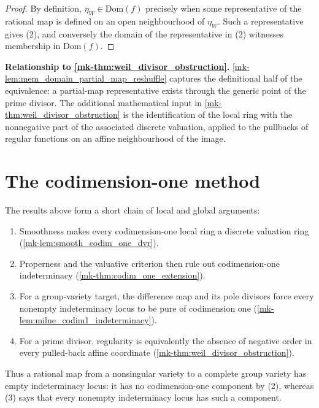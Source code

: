 \begin{proof}

  By definition, \(\eta_W\in\mathrm{Dom}(f)\) precisely when some
  representative of the rational map is defined on an open neighbourhood of
  \(\eta_W\).  Such a representative gives (2), and conversely the domain of
  the representative in (2) witnesses membership in \(\mathrm{Dom}(f)\).
\end{proof}

\begin{remark}
  \label{mk-rmk:mem_domain_partial_map_reshuffle_scope}
  \textbf{Relationship to \ref{mk-thm:weil_divisor_obstruction}.}
  \ref{mk-lem:mem_domain_partial_map_reshuffle} captures the definitional half of
  the equivalence: a partial-map representative exists through the generic point
  of the prime divisor. The additional mathematical input in
  \ref{mk-thm:weil_divisor_obstruction} is the identification of the local ring with
  the nonnegative part of the associated discrete valuation, applied to the
  pullbacks of regular functions on an affine neighbourhood of the image.
\end{remark}

\section{The codimension-one method}
The results above form a short chain of local and global arguments:
\begin{enumerate}
  \item Smoothness makes every codimension-one local ring a discrete
    valuation ring (\ref{mk-lem:smooth_codim_one_dvr}).
  \item Properness and the valuative criterion then rule out
    codimension-one indeterminacy (\ref{mk-thm:codim_one_extension}).
  \item For a group-variety target, the difference map and its pole
    divisors force every nonempty indeterminacy locus to be pure of
    codimension one (\ref{mk-lem:milne_codim1_indeterminacy}).
  \item For a prime divisor, regularity is equivalently the absence of
    negative order in every pulled-back affine coordinate
    (\ref{mk-thm:weil_divisor_obstruction}).
\end{enumerate}
Thus a rational map from a nonsingular variety to a complete group variety
has empty indeterminacy locus: it has no codimension-one component by (2),
whereas (3) says that every nonempty indeterminacy locus has such a component.
